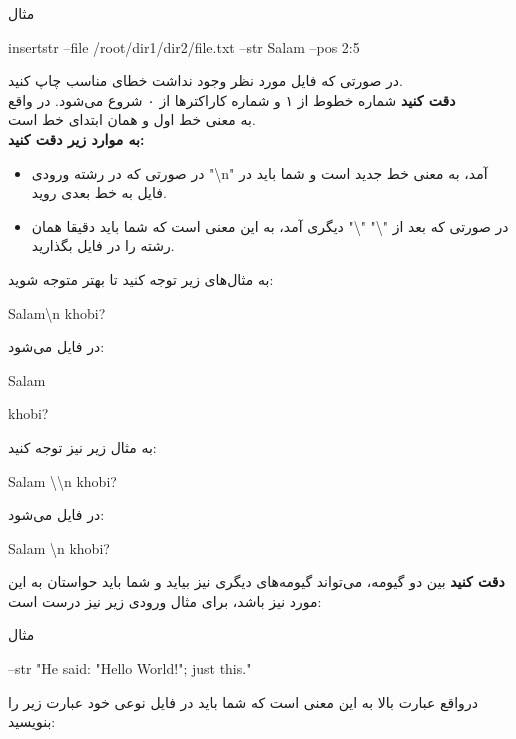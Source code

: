 \documentclass[]{article}
\begin{document}
\begin{mybox}[colback=yellow]{مثال}
	\begin{latin}	
		insertstr --file /root/dir1/dir2/file.txt --str Salam --pos 2:5
	\end{latin}
\end{mybox}

در صورتی که فایل مورد نظر وجود نداشت خطای مناسب چاپ کنید.\\

\textbf{دقت کنید}
شماره خطوط از ۱ و شماره کاراکتر‌ها از ۰ شروع می‌شود. در واقع \\ به معنی خط اول و همان ابتدای خط است.\\

\textbf{به موارد زیر دقت کنید:}
\begin{itemize}
\item 
در صورتی که در رشته ورودی "\textbackslash n" آمد، به معنی خط جدید است و شما باید در فایل به خط بعدی روید.

\item
در صورتی که بعد از "\textbackslash" "\textbackslash" دیگری آمد، به این معنی است که شما باید دقیقا همان رشته را در فایل بگذارید.
\end{itemize}

به مثال‌‌های زیر توجه کنید تا بهتر متوجه شوید:

\begin{latin}
{\mymono
Salam\textbackslash n khobi?\\}
\end{latin}
در فایل می‌شود:\\
\begin{latin}
{\mymono
Salam

khobi?
}
\end{latin} 


به مثال زیر نیز توجه کنید:

\begin{latin}
{\mymono
Salam \textbackslash \textbackslash n khobi?\\}
\end{latin}
در فایل می‌شود:\\
\begin{latin}
{\mymono
Salam \textbackslash n khobi?}
\end{latin} 


\textbf{دقت کنید}
بین دو گیومه، می‌تواند گیومه‌های دیگری نیز بیاید و شما باید حواستان به این مورد نیز باشد، برای مثال ورودی زیر نیز درست است:

\begin{mybox}[colback=yellow]{مثال}
	\begin{latin}	
		--str "He said: "Hello World!"; just this."
	\end{latin}
\end{mybox}
درواقع عبارت بالا به این معنی است که شما باید در فایل نوعی خود عبارت زیر را بنویسید:
\end{document}
